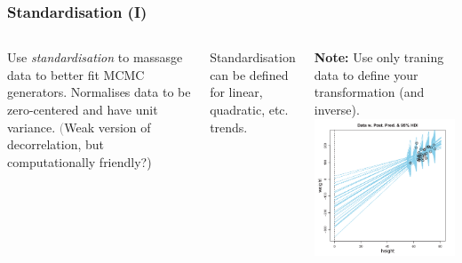 \documentclass[usenames,dvipsnames,table]{beamer}
\begin{document}
\begin{frame}
\frametitle{Standardisation (I)}
\begin{columns}
Use \emph{standardisation} to massasge data to better fit MCMC generators. Normalises data to be zero-centered and have unit variance. \textcolor{gray}(Weak version of decorrelation, but computationally friendly?)

\vspace{1em} Standardisation can be defined for linear, quadratic, etc. trends.

\vspace{1em} \textbf{Note:} Use only traning data to define your transformation (and inverse).
\includegraphics[width=\textwidth]{img/fig17_3_1}
\end{columns}
\end{frame}
\end{document}
